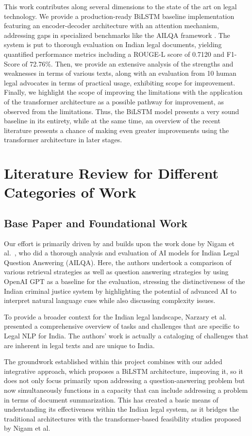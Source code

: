 \documentclass{llncs}
\begin{document}
This work contributes along several dimensions to the state of the art on legal technology. We provide a production-ready BiLSTM baseline implementation featuring an encoder-decoder architecture with an attention mechanism, addressing gaps in specialized benchmarks like the AILQA framework \cite{ailqa2024}. The system is put to thorough evaluation on Indian legal documents, yielding quantified performance metrics including a ROUGE-L score of 0.7120 and F1-Score of 72.76\%. Then, we provide an extensive analysis of the strengths and weaknesses in terms of various texts, along with an evaluation from 10 human legal advocates in terms of practical usage, exhibiting scope for improvement. Finally, we highlight the scope of improving the limitations with the application of the transformer architecture as a possible pathway for improvement, as observed from the limitations. Thus, the BiLSTM model presents a very sound baseline in its entirety, while at the same time, an overview of the recent literature presents a chance of making even greater improvements using the transformer architecture in later stages.
\section{Literature Review for Different Categories of Work}

\subsection{Base Paper and Foundational Work}
Our effort is primarily driven by and builds upon the work done by Nigam et al.~\cite{nigam2023legal}, who did a thorough analysis and evaluation of AI models for Indian Legal Question Answering (AILQA). Here, the authors undertook a comparison of various retrieval strategies as well as question answering strategies by using OpenAI GPT as a baseline for the evaluation, stressing the distinctiveness of the Indian criminal justice system by highlighting the potential of advanced AI to interpret natural language cues while also discussing complexity issues.


To provide a broader context for the Indian legal landscape, Narzary et al.~\cite{narzary2025survey} presented a comprehensive overview of tasks and challenges that are specific to Legal NLP for India. The authors' work is actually a cataloging of challenges that are inherent in legal texts and are unique to India.

The groundwork established within this project combines with our added integrative approach, which proposes a BiLSTM architecture, improving it, so it does not only focus primarily upon addressing a question-answering problem but now simultaneously functions in a capacity that can include addressing a problem in terms of document summarization. This has created a basic means of understanding its effectiveness within the Indian legal system, as it bridges the traditional architectures with the transformer-based feasibility studies proposed by Nigam et al.
\end{document}
